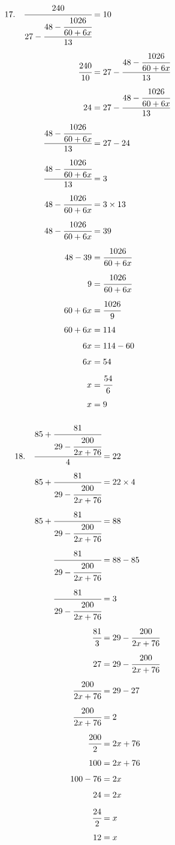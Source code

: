 \documentclass{article}
\begin{document}
\noindent
\begin{minipage}[t]{0.5000\textwidth}
\begin{align*}
17.\hspace{10pt}\cfrac{240}{27-\cfrac{48-\cfrac{1026}{60+6x}}{13}}&=10\\[4pt]
\cfrac{240}{10}&=27-\cfrac{48-\cfrac{1026}{60+6x}}{13}\\[4pt]
24&=27-\cfrac{48-\cfrac{1026}{60+6x}}{13}\\[4pt]
\cfrac{48-\cfrac{1026}{60+6x}}{13}&=27-24\\[4pt]
\cfrac{48-\cfrac{1026}{60+6x}}{13}&=3\\[4pt]
48-\cfrac{1026}{60+6x}&=3\times13\\[4pt]
48-\cfrac{1026}{60+6x}&=39\\[4pt]
48-39&=\cfrac{1026}{60+6x}\\[4pt]
9&=\cfrac{1026}{60+6x}\\[4pt]
60+6x&=\cfrac{1026}{9}\\[4pt]
60+6x&=114\\[4pt]
6x&=114-60\\[4pt]
6x&=54\\[4pt]
x&=\cfrac{54}{6}\\[4pt]
x&=9\\[4pt]
\end{align*}
\end{minipage}
\begin{minipage}[t]{0.5000\textwidth}
\begin{align*}
18.\hspace{10pt}\cfrac{85+\cfrac{81}{29-\cfrac{200}{2x+76}}}{4}&=22\\[4pt]
85+\cfrac{81}{29-\cfrac{200}{2x+76}}&=22\times4\\[4pt]
85+\cfrac{81}{29-\cfrac{200}{2x+76}}&=88\\[4pt]
\cfrac{81}{29-\cfrac{200}{2x+76}}&=88-85\\[4pt]
\cfrac{81}{29-\cfrac{200}{2x+76}}&=3\\[4pt]
\cfrac{81}{3}&=29-\cfrac{200}{2x+76}\\[4pt]
27&=29-\cfrac{200}{2x+76}\\[4pt]
\cfrac{200}{2x+76}&=29-27\\[4pt]
\cfrac{200}{2x+76}&=2\\[4pt]
\cfrac{200}{2}&=2x+76\\[4pt]
100&=2x+76\\[4pt]
100-76&=2x\\[4pt]
24&=2x\\[4pt]
\cfrac{24}{2}&=x\\[4pt]
12&=x\\[4pt]
\end{align*}
\end{minipage}
\vspace{10 mm}
\end{document}
